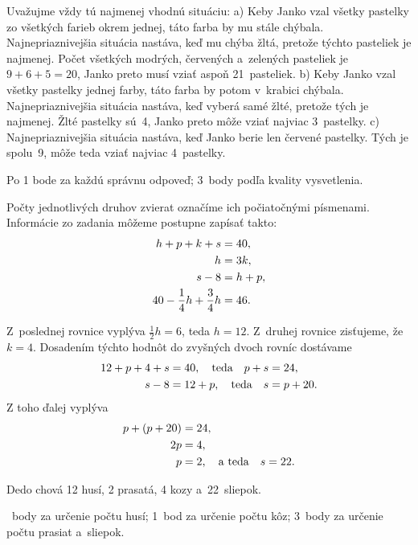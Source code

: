 {%
Uvažujme vždy tú najmenej vhodnú situáciu:
\ite a) Keby Janko vzal všetky pastelky zo všetkých farieb okrem jednej, táto farba by mu stále chýbala.
Najnepriaznivejšia situácia nastáva, keď mu chýba žltá, pretože týchto pasteliek je najmenej.
Počet všetkých modrých, červených a~zelených pasteliek je $9+6+5=20$, Janko preto musí vziať
aspoň 21~pasteliek.
\ite b) Keby Janko vzal všetky pastelky jednej farby, táto farba by potom v~krabici chýbala.
Najnepriaznivejšia situácia nastáva, keď vyberá samé žlté, pretože tých je najmenej.
Žlté pastelky sú~4, Janko preto môže vziať najviac 3~pastelky.
\ite c) Najnepriaznivejšia situácia nastáva, keď Janko berie len červené pastelky.
Tých je spolu~9, môže teda vziať najviac 4~pastelky.

\hodnotenie
Po 1 bode za každú správnu odpoveď;
3~body podľa kvality vysvetlenia.
\endhodnotenie
}

{%
Počty jednotlivých druhov zvierat označíme ich počiatočnými písmenami.
Informácie zo zadania môžeme postupne zapísať takto:
$$
\aligned
h+p+k+s&=40, \\
h&=3k, \\
s-8&=h+p, \\
40-\frac14h+\frac34h&=46.
\endaligned
$$

Z~poslednej rovnice vyplýva $\frac12h=6$, teda $h=12$.
Z~druhej rovnice zisťujeme, že $k=4$.
Dosadením týchto hodnôt do zvyšných dvoch rovníc dostávame
$$
\aligned
12+p+4+s&=40, \quad\text{teda}\quad p+s=24, \\
s-8&=12+p, \quad\text{teda}\quad s=p+20.
\endaligned
$$
Z toho ďalej vyplýva
$$
\aligned
p+(p+20)&=24, \\
2p&=4, \\
p&=2, \quad\text{a~teda}\quad s=22.
\endaligned
$$

Dedo chová 12 husí, 2 prasatá, 4 kozy a~22~sliepok.

~body za určenie počtu husí;
1~bod za určenie počtu kôz;
3~body za určenie počtu prasiat a~sliepok.
\endhodnotenie
}


